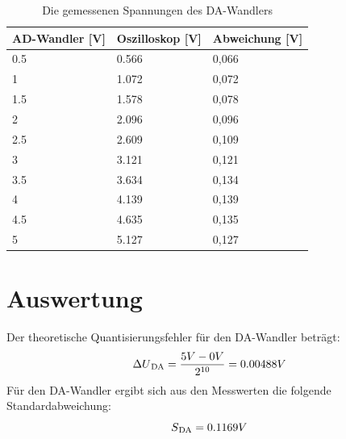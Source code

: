 \documentclass[12pt, oneside, a4paper, \docLanguage]{report}
\begin{document}
\begin{table}[H]
\centering
\begin{tabular}{|l|l|l|}
\hline
\textbf{AD-Wandler {[}V{]}} & \textbf{Oszilloskop {[}V{]}} & \textbf{Abweichung {[}V{]}} \\ \hline
0.5                         & 0.566                        & 0,066                       \\ \hline
1                           & 1.072                        & 0,072                       \\ \hline
1.5                         & 1.578                        & 0,078                       \\ \hline
2                           & 2.096                        & 0,096                       \\ \hline
2.5                         & 2.609                        & 0,109                       \\ \hline
3                           & 3.121                        & 0,121                       \\ \hline
3.5                         & 3.634                        & 0,134                       \\ \hline
4                           & 4.139                        & 0,139                       \\ \hline
4.5                         & 4.635                        & 0,135                       \\ \hline
5                           & 5.127                        & 0,127                       \\ \hline
\end{tabular}
\caption{Die gemessenen Spannungen des DA-Wandlers}
\label{fig:VERSUCH_2_messungen}
\end{table}

\section{Auswertung}
\label{chap:VERSUCH_2_AUSWERTUNG}
Der theoretische Quantisierungsfehler für den DA-Wandler beträgt:
\begin{equation*}
\Delta U\textsubscript{DA} = \frac{5V - 0V}{2\textsuperscript{10}} = 0.00488V
\end{equation*}
Für den DA-Wandler ergibt sich aus den Messwerten die folgende Standardabweichung:
\begin{equation*}
S\textsubscript{DA} = 0.1169V
\end{equation*}
\end{document}
